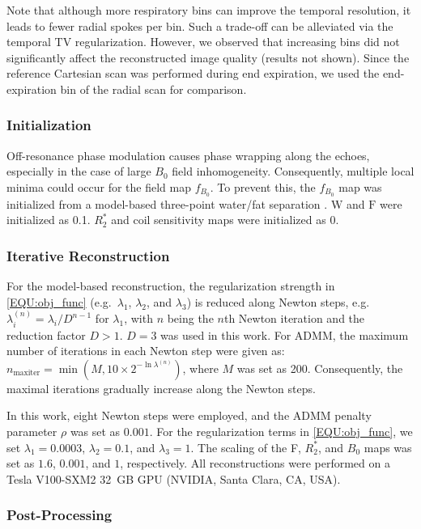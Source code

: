\documentclass[journal,twoside,web]{ieeecolor}
\begin{document}
Note that although more respiratory bins can improve the temporal resolution, 
it leads to fewer radial spokes per bin. Such a trade-off can be alleviated 
via the temporal TV regularization. However, we observed that increasing bins 
did not significantly affect the reconstructed image quality (results not shown). 
Since the reference Cartesian scan was performed during end expiration, 
we used the end-expiration bin of the radial scan for comparison.

\subsubsection*{Initialization}

Off-resonance phase modulation causes phase wrapping along the echoes, 
especially in the case of large $B_0$ field inhomogeneity. 
Consequently, multiple local minima could occur for the field map $f_{B_0}$. 
To prevent this, the $f_{B_0}$ map was initialized 
from a model-based three-point water/fat separation \cite{tan_2019_mobawf}. 
$\mathrm{W}$ and $\mathrm{F}$ were initialized as \num{0.1}. 
${R_2^*}$ and coil sensitivity maps were initialized as \num{0}.

\subsubsection*{Iterative Reconstruction}

For the model-based reconstruction, the regularization strength in \cref{EQU:obj_func} 
(e.g.~$\lambda_1$, $\lambda_2$, and $\lambda_3$) 
is reduced along Newton steps, e.g.~$\lambda_i^{(n)} = \lambda_i / D^{n-1}$ for $\lambda_1$, 
with $n$ being the $n$th Newton iteration 
and the reduction factor $D > 1$.
$D = 3$ was used in this work. 
For ADMM, the maximum number of iterations in each Newton step 
were given as:~$n_\text{maxiter} = \min (M, 10 \times 2^{- \ln \lambda^{(n)}})$, 
where $M$ was set as \num{200}. 
Consequently, the maximal iterations gradually increase along the Newton steps.

In this work, eight Newton steps were employed, 
and the ADMM penalty parameter $\rho$ was set as $0.001$. 
For the regularization terms in \cref{EQU:obj_func}, we set 
$\lambda_1 = 0.0003$, $\lambda_2 = 0.1$, and $\lambda_3 = 1$. 
The scaling of the F, $R_2^*$, and $B_0$ maps was set as 
$1.6$, $0.001$, and $1$, respectively.
All reconstructions were performed on a Tesla V100-SXM2 32~GB GPU 
(NVIDIA, Santa Clara, CA, USA).

\subsubsection*{Post-Processing}
\end{document}
